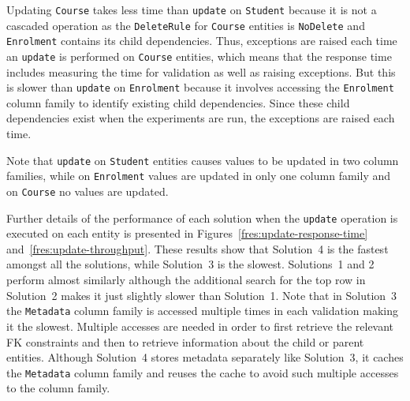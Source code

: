 Updating \texttt{Course} takes less time than \texttt{update} on
\texttt{Student} because it is not a cascaded operation as the
\texttt{DeleteRule} for \texttt{Course} entities is \texttt{NoDelete} and
\texttt{Enrolment} contains its child dependencies.  Thus,  exceptions are
raised each time an \texttt{update} is performed on \texttt{Course} entities, 
which means that the response time includes measuring the time for validation as
well as raising exceptions.  But this is slower than \texttt{update} on
\texttt{Enrolment} because it involves accessing the \texttt{Enrolment} column
family to identify existing child dependencies.  Since these child dependencies
exist when the experiments are run,  the exceptions are raised each time.

% 
Note that \texttt{update} on \texttt{Student} entities causes values to be
updated in two column families,  while on \texttt{Enrolment} values are
updated in only one column family and on \texttt{Course} no values are updated.  


Further details of the performance of each solution when the \texttt{update}
operation is executed on each entity is presented in
Figures~\ref{fres:update-response-time} and~\ref{fres:update-throughput}.
These results show that Solution~4 is the fastest amongst all the solutions, 
while Solution~3 is the slowest.
Solutions~1 and 2 perform almost similarly although the additional search for
the top row in Solution~2 makes it just slightly slower than Solution~1.
Note that in Solution~3 the \texttt{Metadata} column family is accessed multiple
times in each validation making it the slowest.  Multiple accesses are needed in
order to first retrieve the relevant \ac{FK} constraints and then to retrieve
information about the child or parent entities.  Although Solution~4 stores
metadata separately like Solution~3,  it caches the \texttt{Metadata} column
family and reuses the cache to avoid such multiple accesses to the column
family. 

